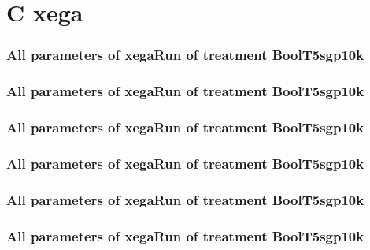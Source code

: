 \documentclass[18pt,c]{beamer}
\begin{document}
\clearpage
\section{C xega}

 \begin{frame}
 \fontsize{8pt}{9pt}\selectfont
 \frametitle{  All parameters of xegaRun of treatment BoolT5sgp10k 
 }

 \label{ExpFtParmTable044.tex}  
 \end{frame}


 \begin{frame}
 \fontsize{8pt}{9pt}\selectfont
 \frametitle{  All parameters of xegaRun of treatment BoolT5sgp10k 
 }

 \label{ExpFtParmTable045.tex}  
 \end{frame}


 \begin{frame}
 \fontsize{8pt}{9pt}\selectfont
 \frametitle{  All parameters of xegaRun of treatment BoolT5sgp10k 
 }

 \label{ExpFtParmTable046.tex}  
 \end{frame}


 \begin{frame}
 \fontsize{8pt}{9pt}\selectfont
 \frametitle{  All parameters of xegaRun of treatment BoolT5sgp10k 
 }

 \label{ExpFtParmTable047.tex}  
 \end{frame}


 \begin{frame}
 \fontsize{8pt}{9pt}\selectfont
 \frametitle{  All parameters of xegaRun of treatment BoolT5sgp10k 
 }

 \label{ExpFtParmTable048.tex}  
 \end{frame}


 \begin{frame}
 \fontsize{8pt}{9pt}\selectfont
 \frametitle{  All parameters of xegaRun of treatment BoolT5sgp10k 
 }

 \label{ExpFtParmTable049.tex}  
 \end{frame}

\end{document}
